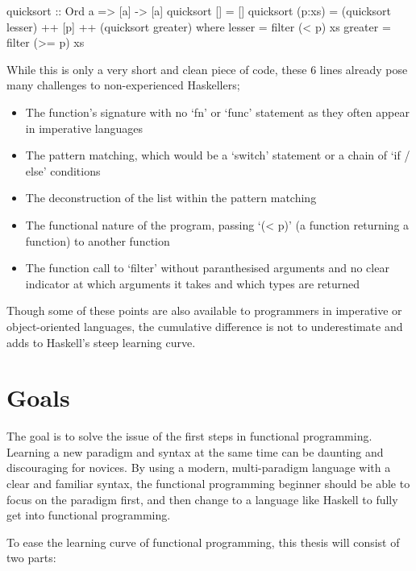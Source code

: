 \begin{haskellcode}
quicksort :: Ord a => [a] -> [a]
quicksort []     = []
quicksort (p:xs) = (quicksort lesser) ++ [p] ++ (quicksort greater)
    where
        lesser  = filter (< p) xs
        greater = filter (>= p) xs
\end{haskellcode}

While this is only a very short and clean piece of code, these 6 lines already pose many challenges to non-experienced Haskellers;

\begin{itemize}
    \item The function's signature with no `fn' or `func' statement as they often appear in imperative languages
    \item The pattern matching, which would be a `switch' statement or a chain of `if / else' conditions
    \item The deconstruction of the list within the pattern matching
    \item The functional nature of the program, passing `(< p)' (a function returning a function) to another function
    \item The function call to `filter' without paranthesised arguments and no clear indicator at which arguments
        it takes and which types are returned
\end{itemize}

Though some of these points are also available to programmers in imperative or object-oriented languages, the cumulative difference
is not to underestimate and adds to Haskell's steep learning curve.


\section{Goals}

The goal is to solve the issue of the first steps in functional programming.
Learning a new paradigm and syntax at the same time can be daunting and discouraging for novices.
By using a modern, multi-paradigm language with a clear
and familiar syntax, the functional programming beginner should be able to focus on the paradigm
first, and then change to a language like Haskell to fully get into functional programming.

To ease the learning curve of functional programming, this thesis will consist of two parts:

